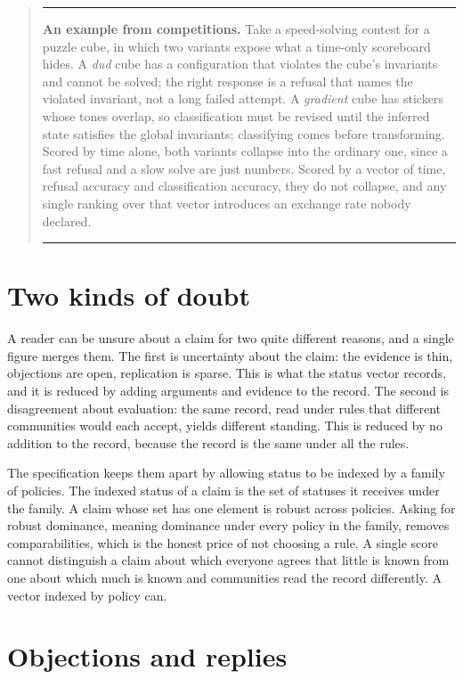 \documentclass[11pt]{article}
\begin{document}
\begin{quote}\small\hrule\medskip
\textbf{An example from competitions.} Take a speed-solving contest for a puzzle cube, in which two variants expose what a time-only scoreboard hides. A \emph{dud} cube has a configuration that violates the cube's invariants and cannot be solved; the right response is a refusal that names the violated invariant, not a long failed attempt. A \emph{gradient} cube has stickers whose tones overlap, so classification must be revised until the inferred state satisfies the global invariants; classifying comes before transforming. Scored by time alone, both variants collapse into the ordinary one, since a fast refusal and a slow solve are just numbers. Scored by a vector of time, refusal accuracy and classification accuracy, they do not collapse, and any single ranking over that vector introduces an exchange rate nobody declared.
\medskip\hrule
\end{quote}

\section{Two kinds of doubt}\label{sec:doubt}

A reader can be unsure about a claim for two quite different reasons, and a single figure merges them. The first is uncertainty about the claim: the evidence is thin, objections are open, replication is sparse. This is what the status vector records, and it is reduced by adding arguments and evidence to the record. The second is disagreement about evaluation: the same record, read under rules that different communities would each accept, yields different standing. This is reduced by no addition to the record, because the record is the same under all the rules.

The specification keeps them apart by allowing status to be indexed by a family of policies. The indexed status of a claim is the set of statuses it receives under the family. A claim whose set has one element is robust across policies. Asking for robust dominance, meaning dominance under every policy in the family, removes comparabilities, which is the honest price of not choosing a rule. A single score cannot distinguish a claim about which everyone agrees that little is known from one about which much is known and communities read the record differently. A vector indexed by policy can.

\section{Objections and replies}\label{sec:objections}
\end{document}
